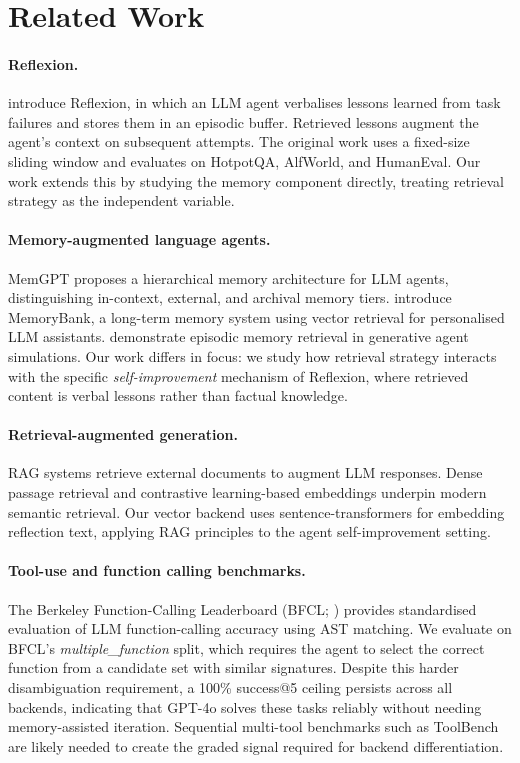 \documentclass{article}
\begin{document}
\section{Related Work}
\label{sec:related}

\paragraph{Reflexion.}
\citet{shinn2023reflexion} introduce Reflexion, in which an LLM agent
verbalises lessons learned from task failures and stores them in an episodic
buffer. Retrieved lessons augment the agent's context on subsequent attempts.
The original work uses a fixed-size sliding window and evaluates on HotpotQA,
AlfWorld, and HumanEval. Our work extends this by studying the memory component
directly, treating retrieval strategy as the independent variable.

\paragraph{Memory-augmented language agents.}
MemGPT \citep{packer2023memgpt} proposes a hierarchical memory architecture for
LLM agents, distinguishing in-context, external, and archival memory tiers.
\citet{zhong2024memorybank} introduce MemoryBank, a long-term memory system
using vector retrieval for personalised LLM assistants. \citet{park2023generative}
demonstrate episodic memory retrieval in generative agent simulations.
Our work differs in focus: we study how retrieval strategy interacts with the
specific \emph{self-improvement} mechanism of Reflexion, where retrieved content
is verbal lessons rather than factual knowledge.

\paragraph{Retrieval-augmented generation.}
RAG systems \citep{lewis2020retrieval} retrieve external documents to augment
LLM responses. Dense passage retrieval \citep{karpukhin2020dense} and
contrastive learning-based embeddings \citep{reimers2019sentencebert} underpin
modern semantic retrieval. Our vector backend uses sentence-transformers
\citep{reimers2019sentencebert} for embedding reflection text, applying RAG
principles to the agent self-improvement setting.

\paragraph{Tool-use and function calling benchmarks.}
The Berkeley Function-Calling Leaderboard (BFCL; \citealt{yan2024bfcl})
provides standardised evaluation of LLM function-calling accuracy using AST
matching. We evaluate on BFCL's \emph{multiple\_function} split, which requires the
agent to select the correct function from a candidate set with similar
signatures. Despite this harder disambiguation requirement, a 100\% success@5
ceiling persists across all backends, indicating that GPT-4o solves these
tasks reliably without needing memory-assisted iteration. Sequential
multi-tool benchmarks such as ToolBench \citep{qin2023toolllm} are likely
needed to create the graded signal required for backend differentiation.
\end{document}
